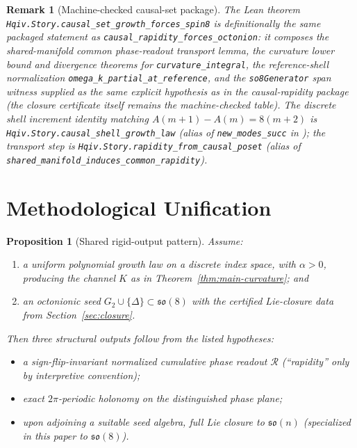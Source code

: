\documentclass[11pt]{amsart}
\newtheorem{proposition}[theorem]{Proposition}
\newtheorem{remark}[theorem]{Remark}
\begin{document}
\begin{remark}[Machine-checked causal-set package]
The Lean theorem \texttt{Hqiv.Story.causal\_set\_growth\_forces\_spin8} is definitionally the same packaged statement as \texttt{causal\_rapidity\_forces\_octonion}: it composes the shared-manifold common phase-readout transport lemma, the curvature lower bound and divergence theorems for \texttt{curvature\_integral}, the reference-shell normalization \texttt{omega\_k\_partial\_at\_reference}, and the \texttt{so8Generator} span witness \emph{supplied as the same explicit hypothesis} as in the causal-rapidity package (the closure certificate itself remains the machine-checked  table). The discrete shell increment identity matching \(A(m+1)-A(m)=8(m+2)\) is \texttt{Hqiv.Story.causal\_shell\_growth\_law} (alias of \texttt{new\_modes\_succ} in ); the transport step is \texttt{Hqiv.Story.rapidity\_from\_causal\_poset} (alias of \texttt{shared\_manifold\_induces\_common\_rapidity}).
\end{remark}

\section{Methodological Unification}

\begin{proposition}[Shared rigid-output pattern]
\label{thm:forced-structure}
Assume:
\begin{enumerate}
  \item a uniform polynomial growth law on a discrete index space, with \(\alpha>0\), producing the channel \(K\) as in Theorem~\ref{thm:main-curvature}; and
  \item an octonionic seed \(G_2\cup\{\Delta\}\subset \mathfrak{so}(8)\) with the certified Lie-closure data from Section~\ref{sec:closure}.
\end{enumerate}
Then three structural outputs follow from the listed hypotheses:
\begin{itemize}
  \item a sign-flip-invariant normalized cumulative phase readout \(\mathcal R\) (``rapidity'' only by interpretive convention);
  \item exact \(2\pi\)-periodic holonomy on the distinguished phase plane;
  \item upon adjoining a suitable seed algebra, full Lie closure to \(\mathfrak{so}(n)\) (specialized in this paper to \(\mathfrak{so}(8)\)).
\end{itemize}
\end{proposition}
\end{document}
